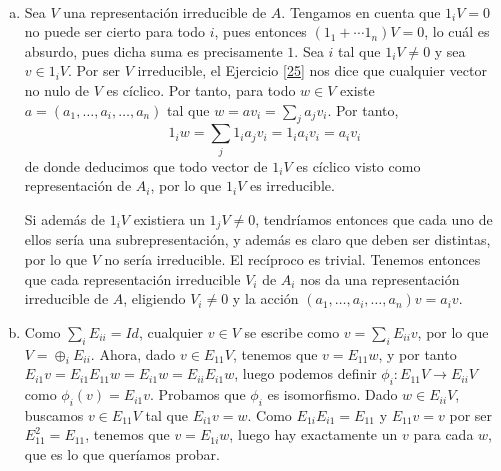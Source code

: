 \documentclass[twoside]{article}
\begin{document}
\begin{solucion}\
\begin{enumerate}[(a)]
\item Sea $V$ una representación irreducible de $A$. Tengamos en cuenta que $1_i V = 0$ no puede ser cierto para todo $i$, pues entonces $(1_1+ \cdots 1_n)V =0$, lo cuál es absurdo, pues dicha suma es precisamente $1$. Sea $i$ tal que $1_i V \neq 0$ y sea $v\in 1_iV$. Por ser $V$ irreducible, el Ejercicio \ref{25} nos dice que cualquier vector no nulo de $V$ es cíclico. Por tanto, para todo $w\in V$ existe $a=(a_1,\dots, a_i,\dots, a_n)$ tal que $w=av_i=\sum_j a_jv_i$. Por tanto, 
\[
1_iw=\sum_j 1_ia_jv_i=1_ia_iv_i=a_iv_i
\]
de donde deducimos que todo vector de $1_iV$ es cíclico visto como representación de $A_i$, por lo que $1_iV$ es irreducible. 

Si además de $1_iV$ existiera un $1_jV\neq 0$, tendríamos entonces que cada uno de ellos sería una subrepresentación, y además es claro que deben ser distintas, por lo que $V$ no sería irreducible. El recíproco es trivial. Tenemos entonces que cada representación irreducible $V_i$ de $A_i$ nos da una representación irreducible de $A$, eligiendo $V_i\neq 0$ y la acción $(a_1,\dots, a_i,\dots, a_n)v=a_iv$. 

\item Como $\sum_i E_{ii}=Id$, cualquier $v\in V$ se escribe como $v=\sum_i E_{ii}v$, por lo que $V=\oplus_i E_{ii}$. Ahora, dado $v\in E_{11}V$, tenemos que $v=E_{11}w$, y por tanto $E_{i1}v=E_{i1}E_{11}w=E_{i1}w=E_{ii}E_{i1}w$, luego podemos definir $\phi_i:E_{11}V\to E_{ii}V$ como $\phi_i(v)=E_{i1}v$. Probamos que $\phi_i$ es isomorfismo. Dado  $w\in E_{ii}V$, buscamos $v\in E_{11}V$ tal que $E_{i1}v=w$. Como $E_{1i}E_{i1}=E_{11}$ y $E_{11}v=v$ por ser $E_{11}^2=E_{11}$, tenemos que $v=E_{1i}w$, luego hay exactamente un $v$ para cada $w$, que es lo que queríamos probar. 


\end{enumerate}
\end{solucion}
\end{document}
